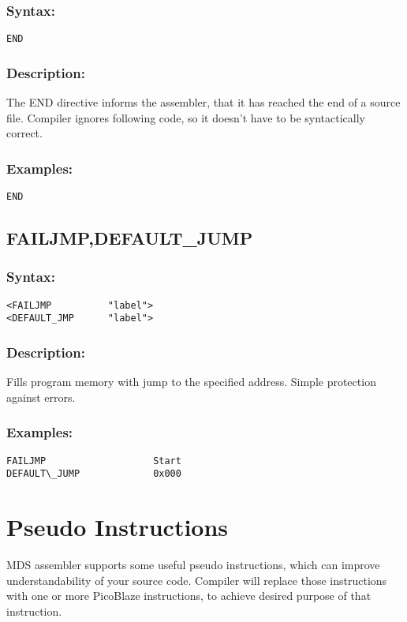         \subsubsection{Syntax:}
            \verb'END'

        \subsubsection{Description:}
            The END directive informs the assembler, that it has reached the end of a source file. Compiler ignores following code, so it doesn't have to be syntactically correct.

        \subsubsection{Examples:}
            {
                \usecodefont
                \verb'END'
            }

    \subsection{FAILJMP,DEFAULT\_JUMP}
        \subsubsection{Syntax:}
            {
                \usecodefont
                \verb'<FAILJMP          "label">'\\
                \verb'<DEFAULT_JMP      "label">'
            }

        \subsubsection{Description:}
            Fills program memory with jump to the specified address. Simple protection against errors.

        \subsubsection{Examples:}
            {
                \usecodefont
                \verb'FAILJMP                   Start'\\
                \verb'DEFAULT\_JUMP             0x000'\\
            }


\section{Pseudo Instructions}
    MDS assembler supports some useful pseudo instructions, which can improve understandability of your source code. Compiler will replace those instructions with one or more PicoBlaze instructions, to achieve desired purpose of that instruction.

